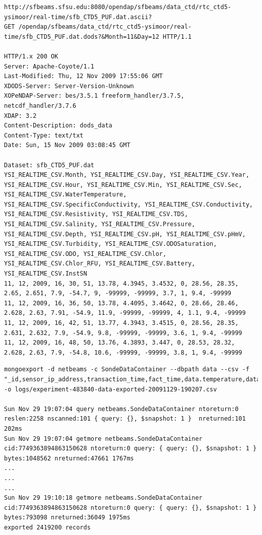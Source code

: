\lstset{label=file:rtc-ysi-opendap,caption=HTTP GET Request x Response to the OPeNDAP server at SF-BEAMS}
\begin{lstlisting}
http://sfbeams.sfsu.edu:8080/opendap/sfbeams/data_ctd/rtc_ctd5-ysimoor/real-time/sfb_CTD5_PUF.dat.ascii?
GET /opendap/sfbeams/data_ctd/rtc_ctd5-ysimoor/real-time/sfb_CTD5_PUF.dat.dods?&Month=11&Day=12 HTTP/1.1

HTTP/1.x 200 OK
Server: Apache-Coyote/1.1
Last-Modified: Thu, 12 Nov 2009 17:55:06 GMT
XDODS-Server: Server-Version-Unknown
XOPeNDAP-Server: bes/3.5.1 freeform_handler/3.7.5, netcdf_handler/3.7.6
XDAP: 3.2
Content-Description: dods_data
Content-Type: text/txt
Date: Sun, 15 Nov 2009 03:08:45 GMT

Dataset: sfb_CTD5_PUF.dat
YSI_REALTIME_CSV.Month, YSI_REALTIME_CSV.Day, YSI_REALTIME_CSV.Year, YSI_REALTIME_CSV.Hour, YSI_REALTIME_CSV.Min, YSI_REALTIME_CSV.Sec, YSI_REALTIME_CSV.WaterTemperature, YSI_REALTIME_CSV.SpecificConductivity, YSI_REALTIME_CSV.Conductivity, YSI_REALTIME_CSV.Resistivity, YSI_REALTIME_CSV.TDS, YSI_REALTIME_CSV.Salinity, YSI_REALTIME_CSV.Pressure, YSI_REALTIME_CSV.Depth, YSI_REALTIME_CSV.pH, YSI_REALTIME_CSV.pHmV, YSI_REALTIME_CSV.Turbidity, YSI_REALTIME_CSV.ODOSaturation, YSI_REALTIME_CSV.ODO, YSI_REALTIME_CSV.Chlor, YSI_REALTIME_CSV.Chlor_RFU, YSI_REALTIME_CSV.Battery, YSI_REALTIME_CSV.InstSN
11, 12, 2009, 16, 30, 51, 13.78, 4.3945, 3.4532, 0, 28.56, 28.35, 2.65, 2.651, 7.9, -54.7, 9, -99999, -99999, 3.7, 1, 9.4, -99999
11, 12, 2009, 16, 36, 50, 13.78, 4.4095, 3.4642, 0, 28.66, 28.46, 2.628, 2.63, 7.91, -54.9, 11.9, -99999, -99999, 4, 1.1, 9.4, -99999
11, 12, 2009, 16, 42, 51, 13.77, 4.3943, 3.4515, 0, 28.56, 28.35, 2.631, 2.632, 7.9, -54.9, 9.8, -99999, -99999, 3.6, 1, 9.4, -99999
11, 12, 2009, 16, 48, 50, 13.76, 4.3893, 3.447, 0, 28.53, 28.32, 2.628, 2.63, 7.9, -54.8, 10.6, -99999, -99999, 3.8, 1, 9.4, -99999
\end{lstlisting}

\lstset{label=file:mongodb-export-command,caption=Export Command to CSV format}
\begin{lstlisting}
mongoexport -d netbeams -c SondeDataContainer --dbpath data --csv -f "_id,sensor_ip_address,transaction_time,fact_time,data.temperature,data.sp_condition,data.condition,data.resistence,data.salinitude,data.pressure,data.depth,data.ph,data.pH_mv,data.odo_sat,data.odo_condition,data.turbidity,data.battery" -o logs/experiment-483840-data-exported-20091129-190207.csv

Sun Nov 29 19:07:04 query netbeams.SondeDataContainer ntoreturn:0 reslen:2258 nscanned:101 { query: {}, $snapshot: 1 }  nreturned:101 202ms
Sun Nov 29 19:07:04 getmore netbeams.SondeDataContainer cid:7749363894863150628 ntoreturn:0 query: { query: {}, $snapshot: 1 }  bytes:1048562 nreturned:47661 1767ms
...
...
...
Sun Nov 29 19:10:18 getmore netbeams.SondeDataContainer cid:7749363894863150628 ntoreturn:0 query: { query: {}, $snapshot: 1 }  bytes:793098 nreturned:36049 1975ms
exported 2419200 records
\end{lstlisting}